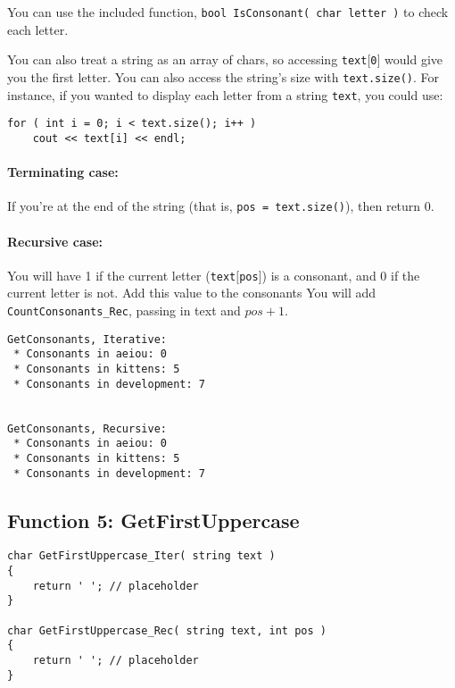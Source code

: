 You can use the included function, \texttt{bool IsConsonant( char letter )}
to check each letter.

You can also treat a string as an array of chars, so accessing
\texttt{text$[$0$]$}
would give you the first letter. You can also access the string's
size with \texttt{text.size()}. For instance, if you wanted to display each
letter from a string \texttt{text}, you could use:

\begin{verbatim}
for ( int i = 0; i < text.size(); i++ )
    cout << text[i] << endl;
\end{verbatim}

\paragraph{Terminating case:}
    If you're at the end of the string (that is, \texttt{pos = text.size()}),
    then return 0.

\paragraph{Recursive case:}
    You will have 1 if the current letter (\texttt{text$[$pos$]$}) is a consonant,
    and 0 if the current letter is not.
    Add this value to the consonants 
    You will add \texttt{CountConsonants\_Rec}, passing in text and $pos+1$.


\begin{lstlisting}[style=output]
GetConsonants, Iterative:
 * Consonants in aeiou: 0
 * Consonants in kittens: 5
 * Consonants in development: 7


GetConsonants, Recursive:
 * Consonants in aeiou: 0
 * Consonants in kittens: 5
 * Consonants in development: 7
\end{lstlisting}


\newpage

\subsection{Function 5: GetFirstUppercase}

\begin{lstlisting}[style=code]
char GetFirstUppercase_Iter( string text )
{
    return ' '; // placeholder
}

char GetFirstUppercase_Rec( string text, int pos )
{
    return ' '; // placeholder
}
\end{lstlisting}

